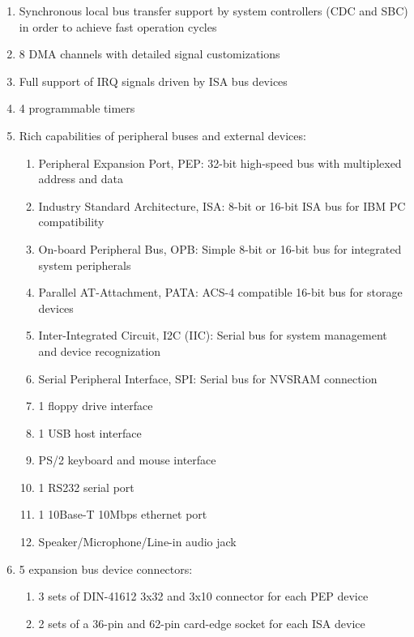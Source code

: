\documentclass[11pt]{report}
\begin{document}
\begin{flushleft}
\begin{enumerate}
\begin{enumerate}
        \end{enumerate}
        \item Synchronous local bus transfer support by system controllers (CDC and SBC) in order to achieve fast operation cycles
        \item 8 DMA channels with detailed signal customizations
        \item Full support of IRQ signals driven by ISA bus devices
        \item 4 programmable timers
        \item Rich capabilities of peripheral buses and external devices:
        \begin{enumerate}
            \item Peripheral Expansion Port, PEP: 32-bit high-speed bus with multiplexed address and data
            \item Industry Standard Architecture, ISA: 8-bit or 16-bit ISA bus for IBM PC compatibility
            \item On-board Peripheral Bus, OPB: Simple 8-bit or 16-bit bus for integrated system peripherals
            \item Parallel AT-Attachment, PATA: ACS-4 compatible 16-bit bus for storage devices
            \item Inter-Integrated Circuit, I2C (IIC): Serial bus for system management and device recognization
            \item Serial Peripheral Interface, SPI: Serial bus for NVSRAM connection
            \item 1 floppy drive interface
            \item 1 USB host interface
            \item PS/2 keyboard and mouse interface
            \item 1 RS232 serial port
            \item 1 10Base-T 10Mbps ethernet port
            \item Speaker/Microphone/Line-in audio jack
        \end{enumerate}
        \item 5 expansion bus device connectors:
        \begin{enumerate}
            \item 3 sets of DIN-41612 3x32 and 3x10 connector for each PEP device
            \item 2 sets of a 36-pin and 62-pin card-edge socket for each ISA device
        \end{enumerate}

\end{enumerate}
\end{flushleft}
\end{document}
